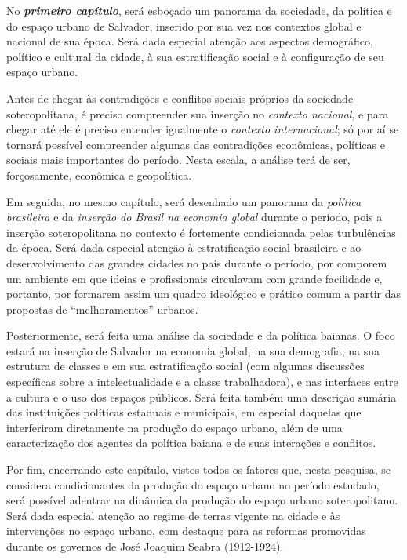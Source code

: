 No \textbf{\textit{primeiro capítulo}}, será esboçado um panorama da sociedade, da política e do espaço urbano de Salvador, inserido por sua vez nos contextos global e nacional de sua época. Será dada especial atenção aos aspectos demográfico, político e cultural da cidade, à sua estratificação social e à configuração de seu espaço urbano. 

Antes de chegar às contradições e conflitos sociais próprios da sociedade soteropolitana, é preciso compreender sua inserção no \textit{contexto nacional}, e para chegar até ele é preciso entender igualmente o \textit{contexto internacional}; só por aí se tornará possível compreender algumas das contradições econômicas, políticas e sociais mais importantes do período. Nesta escala, a análise terá de ser, forçosamente, econômica e geopolítica. 

Em seguida, no mesmo capítulo, será desenhado um panorama da \textit{política brasileira} e da \textit{inserção do Brasil na economia global} durante o período, pois a inserção soteropolitana no contexto é fortemente condicionada pelas turbulências da época. Será dada especial atenção à estratificação social brasileira e ao desenvolvimento das grandes cidades no país durante o período, por comporem um ambiente em que ideias e profissionais circulavam com grande facilidade e, portanto, por formarem assim um quadro ideológico e prático comum a partir das propostas de ``melhoramentos'' urbanos. 

Posteriormente, será feita uma análise da sociedade e da política baianas. O foco estará na inserção de Salvador na economia global, na sua demografia, na sua estrutura de classes e em sua estratificação social (com algumas discussões específicas sobre a intelectualidade e a classe trabalhadora), e nas interfaces entre a cultura e o uso dos espaços públicos. Será feita também uma descrição sumária das instituições políticas estaduais e municipais, em especial daquelas que interferiram diretamente na produção do espaço urbano, além de uma caracterização dos agentes da política baiana e de suas interações e conflitos. 

Por fim, encerrando este capítulo, vistos todos os fatores que, nesta pesquisa, se considera condicionantes da produção do espaço urbano no período estudado, será possível adentrar na dinâmica da produção do espaço urbano soteropolitano. Será dada especial atenção ao regime de terras vigente na cidade e às intervenções no espaço urbano, com destaque para as reformas promovidas durante os governos de José Joaquim Seabra (1912-1924). 

